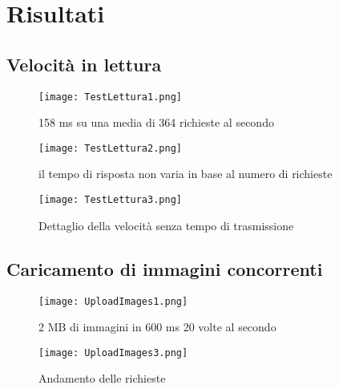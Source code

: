
\chapter{Risultati}

\section{Velocità in lettura}

\begin{figure}[htbp]
    \begin{center}
        \texttt{[image: TestLettura1.png]}
        \caption{158 ms su una media di 364 richieste al secondo}
    \end{center}
\end{figure}

\begin{figure}[htbp]
    \begin{center}
        \texttt{[image: TestLettura2.png]}
        \caption{il tempo di risposta non varia in base al numero di richieste}
    \end{center}
\end{figure}

\begin{figure}[htbp]
    \begin{center}
        \texttt{[image: TestLettura3.png]}
        \caption{Dettaglio della velocità senza tempo di trasmissione}
    \end{center}
\end{figure}
\clearpage
\section{Caricamento di immagini concorrenti}

\begin{figure}[htbp]
    \begin{center}
        \texttt{[image: UploadImages1.png]}
        \caption{2 MB di immagini in 600 ms 20 volte al secondo}  
    \end{center}
\end{figure}

\begin{figure}[htbp]
    \begin{center}
        \texttt{[image: UploadImages3.png]}
        \caption{Andamento delle richieste}  
    \end{center}
\end{figure}

